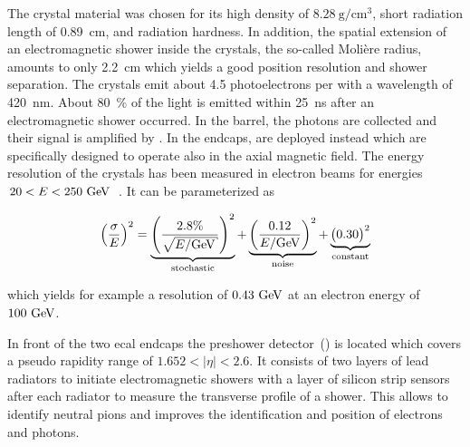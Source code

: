 
The crystal material was chosen for its high density of $8.28~\mathrm{g}/\mathrm{cm}^{3}$, short radiation length of 0.89~cm, and radiation hardness. In addition, the spatial extension of an electromagnetic shower inside the crystals, the so-called Moli\`ere radius, amounts to only 2.2~cm which yields a good position resolution and shower separation. The crystals emit about 4.5 photoelectrons per \MeV with a wavelength of 420~nm. About 80~\% of the light is emitted within 25~ns after an electromagnetic shower occurred. In the barrel, the photons are collected and their signal is amplified by . In the endcaps,  are deployed instead which are specifically designed to operate also in the axial magnetic field. The energy resolution of the crystals has been measured in electron beams for energies $20<E<250~\textrm{GeV}$~\cite{Adzic:2007mi}. It can be parameterized as

\begin{equation}
\left(\frac{\sigma}{E}\right)^{2}=\underbrace{\left(\frac{2.8\%}{\sqrt{E/\GeV}}\right)^{2}}_\text{stochastic}+\underbrace{\left(\frac{0.12}{E/\GeV}\right)^{2}}_\text{noise}+\underbrace{\big(0.30\big)^{2}}_\text{constant}
\end{equation}

which yields for example a resolution of $0.43~\textrm{GeV}$ at an electron energy of $100~\textrm{GeV}$.

In front of the two \gls{ecal} endcaps the preshower detector~() is located which covers a pseudo rapidity range of $1.652<|\eta|<2.6$. It consists of two layers of lead radiators to initiate electromagnetic showers with a layer of silicon strip sensors after each radiator to measure the transverse profile of a shower. This allows to identify neutral pions and improves the identification and position of electrons and photons. 


